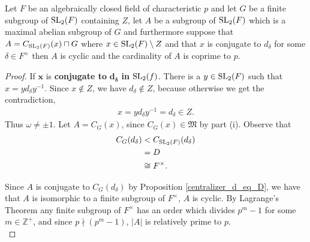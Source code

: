 \begin{theorem}
  \label{MaximalAbelianSubgroup.IsCyclic_and_card_coprime_CharP_of_IsConj_d}
  
  \leanok
  Let $F$ be an algebraically closed field of characteristic $p$ and let $G$ be a finite subgroup of $\operatorname{SL}_2(F)$ containing $Z$, let $A$ be a subgroup of $\operatorname{SL}_2(F)$ which is a maximal abelian subgroup of $G$ and furthermore suppose 
  that $A = C_{\operatorname{SL}_2(F)}(x) \sqcap G$ where $x \in \operatorname{SL}_2(F) \setminus Z$ and that $x$ is conjugate to $d_\delta$ for some $\delta \in F^\times$ then $A$ is cyclic and the cardinality of $A$ is coprime to $p$.
\end{theorem}
\begin{proof}
  \leanok
  If $\pmb{x}$ is \textbf{conjugate to} $\pmb{d_\delta}$ \textbf{in} $\operatorname{SL}_2(f)$. 
  There is a $y \in \operatorname{SL}_2(F)$ such that $x = y d_\delta y^{-1}$. Since $x \not \in Z$, we have $d_\delta \not \in Z$, because otherwise we get the contradiction,
  \begin{align*} x =  y d_\delta y^{-1} = d_\delta \in Z.
  \end{align*}
  Thus $\omega \neq \pm 1$. Let $A = C_G(x)$, since $C_G(x) \in \mathfrak{M}$ by part (i). Observe that
  \begin{align*}  C_G(d_\delta) &<  C_{\operatorname{SL}_2(F)}(d_\delta)  
  \\ &= D
  \\ &\cong F^\times.
  \end{align*}
  
  Since $A$ is conjugate to $C_G(d_\delta)$ by Proposition \ref{centralizer_d_eq_D}, 
  we have that $A$ is isomorphic to a finite subgroup of $F^\times$, $A$ is cyclic. 
  By Lagrange's Theorem any finite subgroup of $F^\times$ has an order which divides $p^m - 1$ for some 
  $m \in \mathbb{Z}^+$, and since $p \nmid (p^m - 1)$, $|A|$ is relatively prime to $p$. \\
\end{proof}
